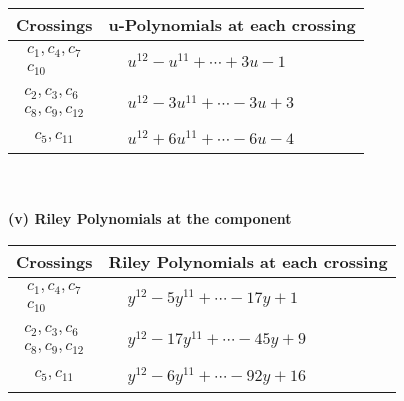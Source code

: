 \documentclass[1p]{elsarticle_modified}
\theoremstyle{definition}
\begin{document}
\begin{tabular}{m{50pt}|m{274pt}}
Crossings & \hspace{64pt}u-Polynomials at each crossing \\
\hline $$\begin{aligned}c_{1},c_{4},c_{7}\\c_{10}\end{aligned}$$&$\begin{aligned}
&u^{12}- u^{11}+\cdots+3 u-1
\end{aligned}$\\
\hline $$\begin{aligned}c_{2},c_{3},c_{6}\\c_{8},c_{9},c_{12}\end{aligned}$$&$\begin{aligned}
&u^{12}-3 u^{11}+\cdots-3 u+3
\end{aligned}$\\
\hline $$\begin{aligned}c_{5},c_{11}\end{aligned}$$&$\begin{aligned}
&u^{12}+6 u^{11}+\cdots-6 u-4
\end{aligned}$\\
\hline
\end{tabular}\\~\\
\newpage\renewcommand{\arraystretch}{1}
\flushleft \textbf{(v) Riley Polynomials at the component}\newline \\
\begin{tabular}{m{50pt}|m{274pt}}
Crossings & \hspace{64pt}Riley Polynomials at each crossing \\
\hline $$\begin{aligned}c_{1},c_{4},c_{7}\\c_{10}\end{aligned}$$&$\begin{aligned}
&y^{12}-5 y^{11}+\cdots-17 y+1
\end{aligned}$\\
\hline $$\begin{aligned}c_{2},c_{3},c_{6}\\c_{8},c_{9},c_{12}\end{aligned}$$&$\begin{aligned}
&y^{12}-17 y^{11}+\cdots-45 y+9
\end{aligned}$\\
\hline $$\begin{aligned}c_{5},c_{11}\end{aligned}$$&$\begin{aligned}
&y^{12}-6 y^{11}+\cdots-92 y+16
\end{aligned}$\\
\hline
\end{tabular}\\~\\
\end{document}
